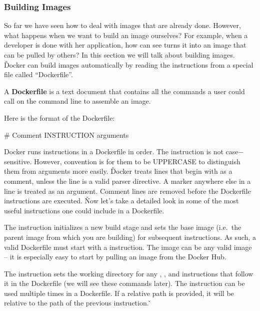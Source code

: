 \subsubsection{Building Images}

So far we have seen how to deal with images that are already done. However, what happens when we want to build an
image ourselves? For example, when a developer is done with her application, how can see turns it into an image that
can be pulled by others? In this section we will talk about building images. \v

Docker can build images automatically by reading the instructions from a special file called ``Dockerfile''.

\bd[Dockerfile]
A \textbf{Dockerfile} is a text document that contains all the commands a user could call on the command line to
assemble an image.
\ed

Here is the format of the Dockerfile:

\begin{block}
# Comment
INSTRUCTION arguments
\end{block}

Docker runs instructions in a Dockerfile in order. The instruction is not case$-$sensitive. However, convention is
for them to be UPPERCASE to distinguish them from arguments more easily. \v

Docker treats lines that begin with \code{$\#$} as a comment, unless the line is a valid parser directive. A
\code{$\#$} marker anywhere else in a line is treated as an argument. Comment lines are removed before the Dockerfile
instructions are executed. \v

Now let's take a detailed look in some of the most useful instructions one could include in a Dockerfile.
\bit
\item The  instruction initializes a new build stage and sets the base image (i.e.\ the parent image from
which you are building) for subsequent instructions. As such, a valid Dockerfile must start with a 
instruction. The image can be any valid image – it is especially easy to start by pulling an image from the Docker Hub.
\item The  instruction sets the working directory for any , , and 
instructions that follow it in the Dockerfile (we will see these commands later). The  instruction can
be used multiple times in a Dockerfile. If a relative path is provided, it will be relative to the path of the
previous  instruction. \v

